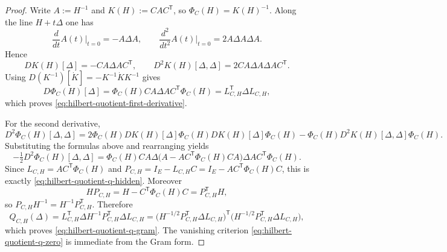 \documentclass[11pt,a4paper]{article}
\numberwithin{equation}{section}
\theoremstyle{thmcompact}
\theoremstyle{remark}
\begin{document}
\begin{proof}
Write $A:=H^{-1}$ and $K(H):=CA C^{\mathsf T}$, so $\Phi_C(H)=K(H)^{-1}$. Along the line $H+t\Delta$ one has
\[
\frac{d}{dt}A(t)\Big|_{t=0}=-A\Delta A,
\qquad
\frac{d^2}{dt^2}A(t)\Big|_{t=0}=2A\Delta A\Delta A.
\]
Hence
\[
DK(H)[\Delta]=-CA\Delta AC^{\mathsf T},
\qquad
D^2K(H)[\Delta,\Delta]=2CA\Delta A\Delta AC^{\mathsf T}.
\]
Using $D(K^{-1})[\dot K]=-K^{-1}\dot K K^{-1}$ gives
\[
D\Phi_C(H)[\Delta]
=\Phi_C(H)CA\Delta AC^{\mathsf T}\Phi_C(H)
=L_{C,H}^{\mathsf T}\Delta L_{C,H},
\]
which proves \eqref{eq:hilbert-quotient-first-derivative}.

For the second derivative,
\[
D^2\Phi_C(H)[\Delta,\Delta]
=2\Phi_C(H)DK(H)[\Delta]\Phi_C(H)DK(H)[\Delta]\Phi_C(H)-\Phi_C(H)D^2K(H)[\Delta,\Delta]\Phi_C(H).
\]
Substituting the formulas above and rearranging yields
\[
-\tfrac12 D^2\Phi_C(H)[\Delta,\Delta]
=\Phi_C(H)CA\Delta\bigl(A-AC^{\mathsf T}\Phi_C(H)CA\bigr)\Delta AC^{\mathsf T}\Phi_C(H).
\]
Since $L_{C,H}=AC^{\mathsf T}\Phi_C(H)$ and $P_{C,H}=I_E-L_{C,H}C=I_E-AC^{\mathsf T}\Phi_C(H)C$, this is exactly \eqref{eq:hilbert-quotient-q-hidden}. Moreover
\[
HP_{C,H}=H-C^{\mathsf T}\Phi_C(H)C=P_{C,H}^{\mathsf T}H,
\]
so $P_{C,H}H^{-1}=H^{-1}P_{C,H}^{\mathsf T}$. Therefore
\[
Q_{C,H}(\Delta)
=L_{C,H}^{\mathsf T}\Delta H^{-1}P_{C,H}^{\mathsf T}\Delta L_{C,H}
=\bigl(H^{-1/2}P_{C,H}^{\mathsf T}\Delta L_{C,H}\bigr)^{\mathsf T}\bigl(H^{-1/2}P_{C,H}^{\mathsf T}\Delta L_{C,H}\bigr),
\]
which proves \eqref{eq:hilbert-quotient-q-gram}. The vanishing criterion \eqref{eq:hilbert-quotient-q-zero} is immediate from the Gram form.
\end{proof}
\end{document}
